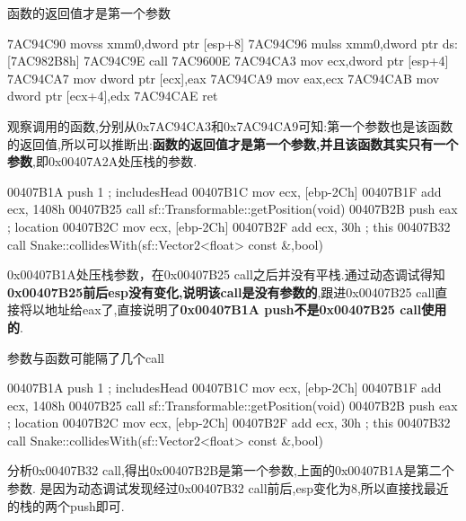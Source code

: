 \documentclass[AutoFakeBold,AutoFakeSlant]{beamer}
\begin{document}
\begin{frame}[fragile]{函数的返回值才是第一个参数}
    \begin{x86asmcode}
        7AC94C90  movss  xmm0,dword ptr [esp+8]
        7AC94C96  mulss  xmm0,dword ptr ds:[7AC982B8h]
        7AC94C9E  call   7AC9600E
        7AC94CA3  mov    ecx,dword ptr [esp+4]
        7AC94CA7  mov    dword ptr [ecx],eax
        7AC94CA9  mov    eax,ecx
        7AC94CAB  mov    dword ptr [ecx+4],edx
        7AC94CAE  ret \end{x86asmcode}
    观察调用的函数,分别从0x7AC94CA3和0x7AC94CA9可知:第一个参数也是该函数的返回值,所以可以推断出:\textbf{函数的返回值才是第一个参数,并且该函数其实只有一个参数},即0x00407A2A处压栈的参数.
\end{frame}


\begin{frame}[fragile]
    \begin{x86asmcode}
        00407B1A  push    1 ; includesHead
        00407B1C  mov     ecx, [ebp-2Ch]
        00407B1F  add     ecx, 1408h
        00407B25  call    sf::Transformable::getPosition(void)
        00407B2B  push    eax ; location
        00407B2C  mov     ecx, [ebp-2Ch]
        00407B2F  add     ecx, 30h ; this
        00407B32  call    Snake::collidesWith(sf::Vector2<float> const &,bool)\end{x86asmcode}
    0x00407B1A处压栈参数，在0x00407B25 call之后并没有平栈.通过动态调试得知\textbf{0x00407B25前后esp没有变化,说明该call是没有参数的},跟进0x00407B25 call直接将以地址给eax了,直接说明了\textbf{0x00407B1A push不是0x00407B25 call使用的}.
\end{frame}

\begin{frame}[fragile]{参数与函数可能隔了几个call}
    \begin{x86asmcode}
        00407B1A  push    1 ; includesHead
        00407B1C  mov     ecx, [ebp-2Ch]
        00407B1F  add     ecx, 1408h
        00407B25  call    sf::Transformable::getPosition(void)
        00407B2B  push    eax ; location
        00407B2C  mov     ecx, [ebp-2Ch]
        00407B2F  add     ecx, 30h ; this
        00407B32  call    Snake::collidesWith(sf::Vector2<float> const &,bool)\end{x86asmcode}
    分析0x00407B32 call,得出0x00407B2B是第一个参数,上面的0x00407B1A是第二个参数.    是因为动态调试发现经过0x00407B32 call前后,esp变化为8,所以直接找最近的栈的两个push即可.
\end{frame}
\end{document}
